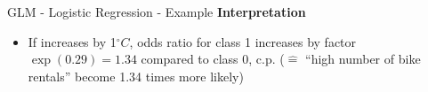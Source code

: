 \documentclass[11pt,compress,t,notes=noshow, aspectratio=169, xcolor=table]{beamer}
\begin{document}
\begin{frame}{GLM - Logistic Regression - Example}
\textbf{Interpretation}
\begin{itemize}
    \item If  increases by 1$^\circ C$, odds ratio for class 1 increases by factor $\exp (0.29) = 1.34$ compared to class 0, c.p. ($\hat =$ ``high number of bike rentals'' become 1.34 times more likely)
\end{itemize}
\end{frame}


\endlecture
\end{document}
